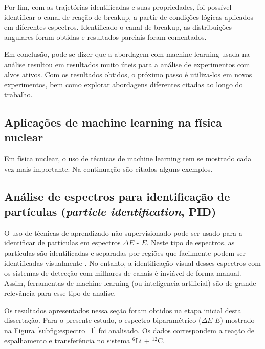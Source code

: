 \documentclass[a4paper,12pt,oneside]{book}
\begin{document}
\par Por fim, com as trajetórias identificadas e suas propriedades, foi possível identificar o canal de reação de breakup, a partir de condições lógicas aplicados em diferentes espectros. Identificado o canal de breakup, as distribuições angulares foram obtidas e resultados parciais foram comentados.

\par Em conclusão, pode-se dizer que a abordagem com machine learning usada na análise resultou em resultados muito úteis para a análise de experimentos com alvos ativos. Com os resultados obtidos, o próximo passo é utiliza-los em novos experimentos, bem como explorar abordagens diferentes citadas ao longo do trabalho.

\begin{appendices}


\chapter{Aplicações de machine learning na física nuclear} \label{appendix:ml_nuclear}

\par Em física nuclear, o uso de técnicas de machine learning tem se mostrado cada vez mais importante. Na continuação são citados alguns exemplos.

\section{Análise de espectros para identificação de partículas (\textit{particle identification}, PID)}

\par O uso de técnicas de aprendizado não supervisionado pode ser usado para a identificar de partículas em espectros $\Delta E$ - $E$. Neste tipo de espectros, as partículas são identificadas e separadas por regiões que facilmente podem ser identificadas visualmente \cite{DETC_TELE}. No entanto, a identificação visual desses espectros com os sistemas de detecção com milhares de canais é inviável de forma manual. Assim, ferramentas de machine learning (ou inteligencia artificial) são de grande relevância para esse tipo de analise.

Os resultados apresentados nessa seção foram obtidos na etapa inicial desta dissertação. Para o presente estudo, o espectro biparamétrico ($\Delta E$-$E$) mostrado na Figura \ref{subfig:espectro_1} foi analisado. Os dados correspondem a reação de espalhamento e transferência no sistema $^{6}$Li + $^{12}$C.



\end{appendices}
\end{document}
